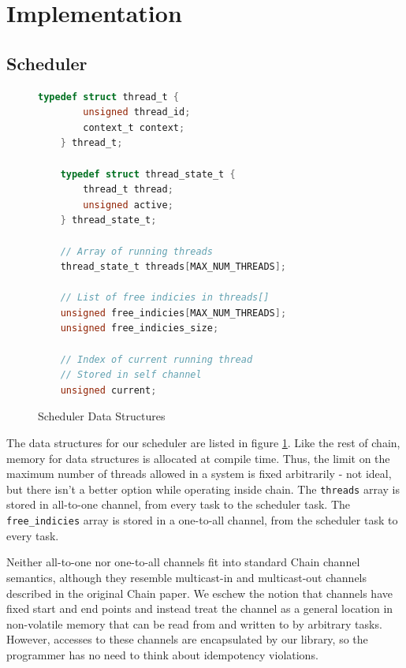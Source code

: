 \documentclass[11pt]{sensys-proc}
\newcommand{\chain}{Chain\xspace}
\begin{document}
\section{Implementation}
\subsection{Scheduler}
\begin{figure}
\begin{minipage}[b]{.48\textwidth}
\begin{lstlisting}[language=C]
    typedef struct thread_t {
        unsigned thread_id;
        context_t context;
    } thread_t;

    typedef struct thread_state_t {
        thread_t thread;
        unsigned active;
    } thread_state_t;

    // Array of running threads
    thread_state_t threads[MAX_NUM_THREADS];

    // List of free indicies in threads[]
    unsigned free_indicies[MAX_NUM_THREADS];
    unsigned free_indicies_size;

    // Index of current running thread
    // Stored in self channel
    unsigned current;
\end{lstlisting}
\caption{Scheduler Data Structures}\label{schDataStruct}
\end{minipage}\hfill
\end{figure}

The data structures for our scheduler are listed in figure \ref{schDataStruct}.
Like the rest of chain, memory for data structures is allocated at compile
time. Thus, the limit on the maximum number of threads allowed in a system is
fixed arbitrarily - not ideal, but there isn't a better option while operating
inside chain. The \texttt{threads} array is stored in all-to-one channel, from
every task to the scheduler task. The \texttt{free\_indicies} array is stored
in a one-to-all channel, from the scheduler task to every task.


Neither all-to-one nor one-to-all channels fit into standard \chain channel
semantics, although they resemble multicast-in and multicast-out channels
described in the original \chain paper. We eschew the notion that channels
have fixed start and end points and instead treat the channel as a general
location in non-volatile memory that can be read from and written to by
arbitrary tasks. However, accesses to these channels are encapsulated by our
library, so the programmer has no need to think about idempotency violations.
\end{document}
